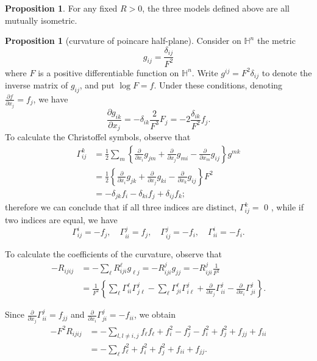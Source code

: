 \documentclass[12pt,a4paper]{book}
\newcommand{\bb}[1]{\mathbb{#1}}
\theoremstyle{definition}
\newtheorem{prop}[defn]{Proposition}
\begin{document}
\begin{prop}
    For any fixed $R>0$, the three models defined above are all mutually isometric.
\end{prop}
\begin{prop}[curvature of poincare half-plane]
    Consider on $\bb{H}^n$ the metric
    $$
        g_{i j}=\frac{\delta_{i j}}{F^2}
    $$
    where $F$ is a positive differentiable function on $\bb{H}^n$.
    Write $g^{i j}=F^2 \delta_{i j}$ to denote the inverse matrix of $g_{i j}$, and put $\log F=f$. Under these conditions, denoting $\frac{\partial f}{\partial x_j}=f_j$, we have
    $$
        \frac{\partial g_{i k}}{\partial x_j}=-\delta_{i k} \frac{2}{F^3} F_j=-2 \frac{\delta_{i k}}{F^2} f_j .
    $$
    To calculate the Christoffel symbols, observe that
    $$
        \begin{aligned}
            \Gamma_{i j}^k & =\frac{1}{2} \sum_m\left\{\frac{\partial}{\partial x_i} g_{j m}+\frac{\partial}{\partial x_j} g_{m i}-\frac{\partial}{\partial x_m} g_{i j}\right\} g^{m k} \\
                           & =\frac{1}{2}\left\{\frac{\partial}{\partial x_i} g_{j k}+\frac{\partial}{\partial x_j} g_{k i}-\frac{\partial}{\partial x_k} g_{i j}\right\} F^2            \\
                           & =-\delta_{j k} f_i-\delta_{k i} f_j+\delta_{i j} f_k ;
        \end{aligned}
    $$
    therefore we can conclude that if all three indices are distinct, $\Gamma_{i j}^k=$ 0 , while if two indices are equal, we have
    $$
        \Gamma_{i j}^i=-f_j, \quad \Gamma_{i i}^j=f_j, \quad \Gamma_{i j}^j=-f_i, \quad \Gamma_{i i}^i=-f_i .
    $$

    To calculate the coefficients of the curvature, observe that
    $$
        \begin{aligned}
            -R_{i j i j} & =-\sum_{\ell} R_{i j i}^{\ell} g_{\ell j}=-R_{i j i}^j g_{j j}=-R_{i j i}^j \frac{1}{F^2}                                                                                                                                    \\
                         & =\frac{1}{F^2}\left\{\sum_{\ell} \Gamma_{i i}^{\ell} \Gamma_{j \ell}^j-\sum_{\ell} \Gamma_{j i}^{\ell} \Gamma_{i \ell}^j+\frac{\partial}{\partial x_j} \Gamma_{i i}^j-\frac{\partial}{\partial x_i} \Gamma_{j i}^j\right\} .
        \end{aligned}
    $$

    Since $\frac{\partial}{\partial x_j} \Gamma_{i i}^j=f_{j j}$ and $\frac{\partial}{\partial x_i} \Gamma_{j i}^j=-f_{i i}$, we obtain
    $$
        \begin{aligned}
            -F^2 R_{i j i j} & =-\sum_{l, l\neq i,j} f_{\ell} f_{\ell}+f_i^2-f_j^2-f_i^2+f_j^2+f_{j j}+f_{i i} \\
                             & =-\sum_{\ell} f_{\ell}^2+f_i^2+f_j^2+f_{i i}+f_{j j} .
        \end{aligned}
    $$


\end{prop}
\end{document}
